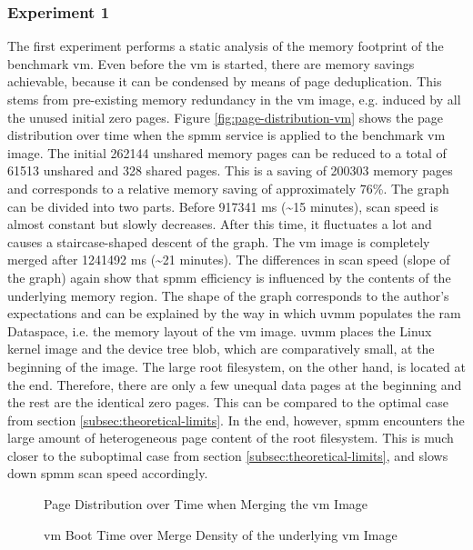 \subsubsection*{Experiment 1}
\label{subsubsec:ex1}

The first experiment performs a static analysis of the memory footprint of the benchmark \ac{vm}.
Even before the \ac{vm} is started, there are memory savings achievable, because it can be condensed by means of page deduplication.
This stems from pre-existing memory redundancy in the \ac{vm} image, e.g. induced by all the unused initial zero pages.
Figure \ref{fig:page-distribution-vm} shows the page distribution over time when the \ac{spmm} service is applied to the benchmark \ac{vm} image.
The initial 262144 unshared memory pages can be reduced to a total of 61513 unshared and 328 shared pages.
This is a saving of 200303 memory pages and corresponds to a relative memory saving of approximately 76\%.
The graph can be divided into two parts.
Before 917341 ms (\textasciitilde{}15 minutes), scan speed is almost constant but slowly decreases.
After this time, it fluctuates a lot and causes a staircase-shaped descent of the graph.
The \ac{vm} image is completely merged after 1241492 ms (\textasciitilde{}21 minutes).
The differences in scan speed (slope of the graph) again show that \ac{spmm} efficiency is influenced by the contents of the underlying memory region.
The shape of the graph corresponds to the author's expectations and can be explained by the way in which \ac{uvmm} populates the \ac{ram} Dataspace, i.e. the memory layout of the \ac{vm} image.
\Ac{uvmm} places the Linux kernel image and the device tree blob, which are comparatively small, at the beginning of the image.
The large root filesystem, on the other hand, is located at the end.
Therefore, there are only a few unequal data pages at the beginning and the rest are the identical zero pages.
This can be compared to the optimal case from section \ref{subsec:theoretical-limits}.
In the end, however, \ac{spmm} encounters the large amount of heterogeneous page content of the root filesystem.
This is much closer to the suboptimal case from section \ref{subsec:theoretical-limits}, and slows down \ac{spmm} scan speed accordingly.

\begin{figure}
  \centering
  
  \caption{Page Distribution over Time when Merging the \acs{vm} Image}
  \label{fig:page-distribution-vm}
  \centering
  
  \caption{\acs{vm} Boot Time over Merge Density of the underlying \ac{vm} Image}
  \label{fig:boot-time-vm}
\end{figure}

